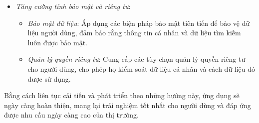 \begin{itemize}
    \item \textit{Tăng cường tính bảo mật và riêng tư}:
    \begin{itemize}
        \item \textit{Bảo mật dữ liệu}: Áp dụng các biện pháp bảo mật tiên tiến để bảo vệ dữ liệu người dùng, đảm bảo rằng thông tin cá nhân và dữ liệu tìm kiếm luôn được bảo mật.
        \item \textit{Quản lý quyền riêng tư}: Cung cấp các tùy chọn quản lý quyền riêng tư cho người dùng, cho phép họ kiểm soát dữ liệu cá nhân và cách dữ liệu đó được sử dụng.
    \end{itemize}
\end{itemize}
\hspace*{1cm} Bằng cách liên tục cải tiến và phát triển theo những hướng này, ứng dụng sẽ ngày càng hoàn thiện, mang lại trải nghiệm tốt nhất cho người dùng và đáp ứng được nhu cầu ngày càng cao của thị trường.